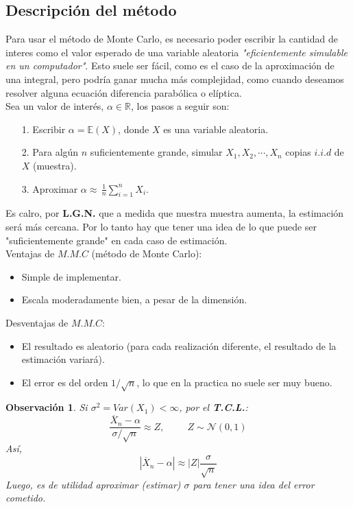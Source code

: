 \documentclass[a4paper]{article}
\numberwithin{equation}{subsection}
\numberwithin{definicion}{subsection}
\newtheorem{obs}{Observación}
\def\R{\mathbb R}
\def\E{\mathbb E}
\begin{document}
\subsection{Descripción del método}
Para usar el método de Monte Carlo, es necesario poder escribir la cantidad de interes como el valor esperado de una variable aleatoria \textit{"eficientemente simulable en un computador"}. Esto suele ser fácil, como es el caso de la aproximación de una integral, pero podría ganar mucha más complejidad, como cuando deseamos resolver alguna ecuación diferencia parabólica o elíptica.\\ \newline
Sea un valor de interés, $\alpha\in\R$, los pasos a seguir son:
\begin{itemize}
    \item[1.] Escribir $\alpha = \E(X)$, donde $X$ es una variable aleatoria.
    \item[2.] Para algún $n$ suficientemente grande, simular $X_1,X_2,\cdots,X_n$ copias $i.i.d$ de $X$ (muestra).
    \item[3.] Aproximar $\alpha\approx\,\frac{1}{n}\sum_{i=1}^nX_i$.
\end{itemize}
Es calro, por \textbf{L.G.N.} que a medida que nuestra muestra aumenta, la estimación será más cercana. Por lo tanto hay que tener una idea de lo que puede ser "suficientemente grande" en cada caso de estimación.\\
Ventajas de $M.M.C$ (método de Monte Carlo):\\
\begin{itemize}
    \item Simple de implementar.
    \item Escala moderadamente bien, a pesar de la dimensión.
\end{itemize}
Desventajas de $M.M.C$:
\begin{itemize}
    \item El resultado es aleatorio (para cada realización diferente, el resultado de la estimación variará).
    \item El error es del orden $1/\sqrt{n}$, lo que en la practica no suele ser muy bueno.
\end{itemize}
\begin{obs} Si $\sigma^2 = Var(X_1)<\infty$, por el \textbf{T.C.L.}:
\[\frac{\overline{X}_n -\alpha}{\sigma / \sqrt{n}}\approx Z,\hspace{1cm}Z\sim\mathcal{N}(0,1)\]
Así,
\[|\overline{X}_n -\alpha| \approx|Z|\frac{\sigma}{\sqrt{n}}\]
Luego, es de utilidad aproximar (estimar) $\sigma$ para tener una idea del error cometido. 
\end{obs}
\end{document}
